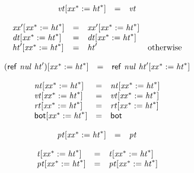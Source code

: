 $$
\begin{array}{@{}lcl@{}l@{}}
{{\mathit{vt}}}{[{{\mathit{xx}}^\ast} := {{\mathit{ht}}^\ast}]} &=& {\mathit{vt}} &  \\
\end{array}
$$

$$
\begin{array}{@{}lcl@{}l@{}}
{{\mathit{xx}'}}{[{{\mathit{xx}}^\ast} := {{\mathit{ht}}^\ast}]} &=& {{\mathit{xx}'}}{[{{\mathit{xx}}^\ast} := {{\mathit{ht}}^\ast}]} &  \\
{{\mathit{dt}}}{[{{\mathit{xx}}^\ast} := {{\mathit{ht}}^\ast}]} &=& {{\mathit{dt}}}{[{{\mathit{xx}}^\ast} := {{\mathit{ht}}^\ast}]} &  \\
{{\mathit{ht}'}}{[{{\mathit{xx}}^\ast} := {{\mathit{ht}}^\ast}]} &=& {\mathit{ht}'} &\quad
  \mbox{otherwise} \\
\end{array}
$$

$$
\begin{array}{@{}lcl@{}l@{}}
{(\mathsf{ref}~{\mathit{nul}}~{\mathit{ht}'})}{[{{\mathit{xx}}^\ast} := {{\mathit{ht}}^\ast}]} &=& \mathsf{ref}~{\mathit{nul}}~{{\mathit{ht}'}}{[{{\mathit{xx}}^\ast} := {{\mathit{ht}}^\ast}]} &  \\
\end{array}
$$

$$
\begin{array}{@{}lcl@{}l@{}}
{{\mathit{nt}}}{[{{\mathit{xx}}^\ast} := {{\mathit{ht}}^\ast}]} &=& {{\mathit{nt}}}{[{{\mathit{xx}}^\ast} := {{\mathit{ht}}^\ast}]} &  \\
{{\mathit{vt}}}{[{{\mathit{xx}}^\ast} := {{\mathit{ht}}^\ast}]} &=& {{\mathit{vt}}}{[{{\mathit{xx}}^\ast} := {{\mathit{ht}}^\ast}]} &  \\
{{\mathit{rt}}}{[{{\mathit{xx}}^\ast} := {{\mathit{ht}}^\ast}]} &=& {{\mathit{rt}}}{[{{\mathit{xx}}^\ast} := {{\mathit{ht}}^\ast}]} &  \\
{\mathsf{bot}}{[{{\mathit{xx}}^\ast} := {{\mathit{ht}}^\ast}]} &=& \mathsf{bot} &  \\
\end{array}
$$

$$
\begin{array}{@{}lcl@{}l@{}}
{{\mathit{pt}}}{[{{\mathit{xx}}^\ast} := {{\mathit{ht}}^\ast}]} &=& {\mathit{pt}} &  \\
\end{array}
$$

$$
\begin{array}{@{}lcl@{}l@{}}
{{\mathit{t}}}{[{{\mathit{xx}}^\ast} := {{\mathit{ht}}^\ast}]} &=& {{\mathit{t}}}{[{{\mathit{xx}}^\ast} := {{\mathit{ht}}^\ast}]} &  \\
{{\mathit{pt}}}{[{{\mathit{xx}}^\ast} := {{\mathit{ht}}^\ast}]} &=& {{\mathit{pt}}}{[{{\mathit{xx}}^\ast} := {{\mathit{ht}}^\ast}]} &  \\
\end{array}
$$

